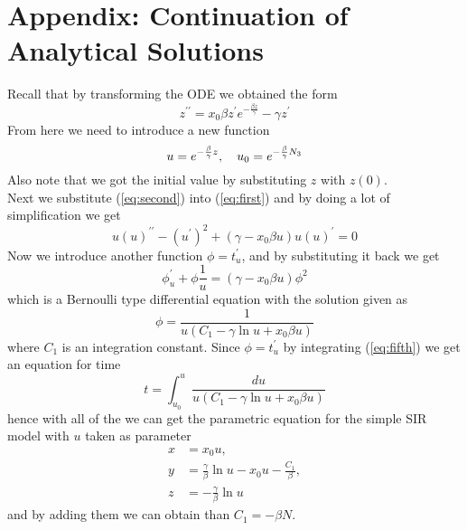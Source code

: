 \section{Appendix: Continuation of Analytical Solutions}\label{appendix-b}\thispagestyle{SectionFirstPage} %
\setcounter{figure}{0}
\setcounter{table}{0}
Recall that by transforming the ODE we obtained the form
\begin{equation} \label{eq:first}
	z^{\prime\prime} = x_{0} \beta z^{\prime} e^{-\frac{\beta z}{\gamma}} - \gamma z^{\prime}
\end{equation}
From here we need to introduce a new function 
\begin{equation} \label{eq:second}
	u = e^{-\frac{\beta}{\gamma}z}, \quad u_0 = e^{-\frac{\beta}{\gamma}N_3}\\
\end{equation}
Also note that we got the initial value by substituting $z$ with $z(0)$.\\
Next we substitute (\ref{eq:second}) into (\ref{eq:first}) and by doing a lot of simplification we get
\begin{equation} \label{eq:third}
	u(u)^{\prime\prime} - (u^{\prime})^2 + (\gamma - x_0\beta u)u(u)^\prime = 0
\end{equation}
Now we introduce another function $\phi = t^{\prime}_{u}$, and by substituting it back we get
\begin{equation} \label{eq:forth}
	\phi^{\prime}_u + \phi\frac{1}{u} = (\gamma-x_0\beta u)\phi^2
\end{equation}
which is a Bernoulli type differential equation with the solution given as
\begin{equation} \label{eq:fifth}
	\phi = \frac{1}{u(C_1-\gamma \ln u + x_0\beta u)}
\end{equation}
where $C_1$ is an integration constant. Since $\phi = t^{\prime}_{u}$ by integrating (\ref{eq:fifth}) we get an equation for time
\begin{equation} \label{eq:sixth}
	t = \int_{u_0}^{u} \frac{du}{u(C_1-\gamma \ln u + x_0\beta u)}
\end{equation}
hence with all of the we can get the parametric equation for the simple SIR model with $u$ taken as parameter
\begin{align*} \label{eq:parameter}
	x &= x_0u,\\
	y &= \frac{\gamma}{\beta}\ln u - x_0u - \frac{C_1}{\beta},\\
	z &= -\frac{\gamma}{\beta}\ln u
\end{align*}
and by adding them we can obtain than $C_1 = -\beta N$.
